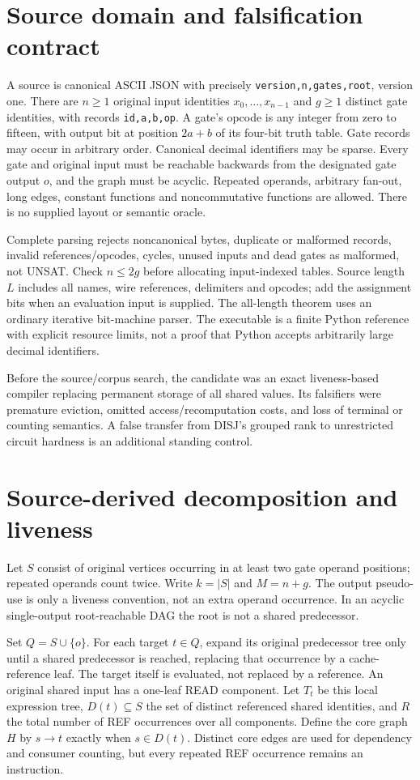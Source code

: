 \documentclass[11pt]{article}
\begin{document}
\section{Source domain and falsification contract}
A source is canonical ASCII JSON with precisely \texttt{version,n,gates,root}, version one. There are $n\ge1$ original input identities $x_0,\ldots,x_{n-1}$ and $g\ge1$ distinct gate identities, with records \texttt{id,a,b,op}. A gate's opcode is any integer from zero to fifteen, with output bit at position $2a+b$ of its four-bit truth table. Gate records may occur in arbitrary order. Canonical decimal identifiers may be sparse. Every gate and original input must be reachable backwards from the designated gate output $o$, and the graph must be acyclic. Repeated operands, arbitrary fan-out, long edges, constant functions and noncommutative functions are allowed. There is no supplied layout or semantic oracle.

Complete parsing rejects noncanonical bytes, duplicate or malformed records, invalid references/opcodes, cycles, unused inputs and dead gates as malformed, not UNSAT. Check $n\le2g$ before allocating input-indexed tables. Source length $L$ includes all names, wire references, delimiters and opcodes; add the assignment bits when an evaluation input is supplied. The all-length theorem uses an ordinary iterative bit-machine parser. The executable is a finite Python reference with explicit resource limits, not a proof that Python accepts arbitrarily large decimal identifiers.

Before the source/corpus search, the candidate was an exact liveness-based compiler replacing permanent storage of all shared values. Its falsifiers were premature eviction, omitted access/recomputation costs, and loss of terminal or counting semantics. A false transfer from DISJ's grouped rank to unrestricted circuit hardness is an additional standing control.

\section{Source-derived decomposition and liveness}
Let $S$ consist of original vertices occurring in at least two gate operand positions; repeated operands count twice. Write $k=|S|$ and $M=n+g$. The output pseudo-use is only a liveness convention, not an extra operand occurrence. In an acyclic single-output root-reachable DAG the root is not a shared predecessor.

Set $Q=S\cup\{o\}$. For each target $t\in Q$, expand its original predecessor tree only until a shared predecessor is reached, replacing that occurrence by a cache-reference leaf. The target itself is evaluated, not replaced by a reference. An original shared input has a one-leaf READ component. Let $T_t$ be this local expression tree, $D(t)\subseteq S$ the set of distinct referenced shared identities, and $R$ the total number of REF occurrences over all components. Define the core graph $H$ by $s\to t$ exactly when $s\in D(t)$. Distinct core edges are used for dependency and consumer counting, but every repeated REF occurrence remains an instruction.
\end{document}
